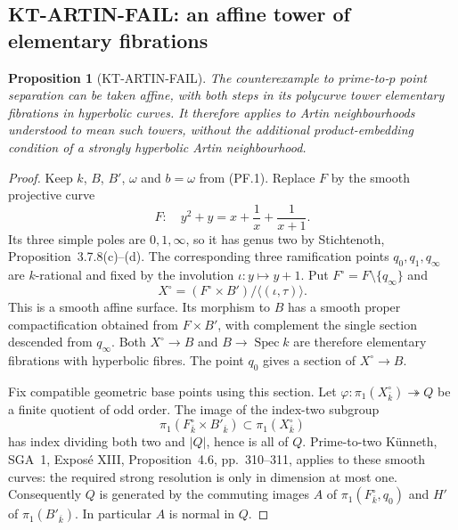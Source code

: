 \documentclass[11pt,a4paper]{article}
\newtheorem{proposition}[theorem]{Proposition}
\theoremstyle{definition}
\begin{document}
\subsection{KT-ARTIN-FAIL: an affine tower of elementary fibrations}
\label{sec:kt-artin-fail}

\begin{proposition}[KT-ARTIN-FAIL]
The counterexample to prime-to-$p$ point separation can be taken
affine, with both steps in its polycurve tower elementary
fibrations in hyperbolic curves. It therefore applies to Artin
neighbourhoods understood to mean such towers, without the
additional product-embedding condition of a \emph{strongly}
hyperbolic Artin neighbourhood.
\end{proposition}

\begin{proof}
Keep $k$, $B$, $B'$, $\omega$ and $b=\omega$ from (PF.1).
Replace $F$ by the smooth projective curve
\[
 F:\quad y^2+y=x+\frac1x+\frac1{x+1}.
                                                               \tag{AF.1}
\]
Its three simple poles are $0,1,\infty$, so it has genus two
by Stichtenoth, Proposition~3.7.8(c)--(d). The corresponding
three ramification points $q_0,q_1,q_\infty$ are $k$-rational
and fixed by the involution $\iota:y\mapsto y+1$.
Put $F^\circ=F\setminus\{q_\infty\}$ and
\[
 X^\circ=(F^\circ\times B')/\langle(\iota,\tau)\rangle.
                                                               \tag{AF.2}
\]
This is a smooth affine surface. Its morphism to $B$ has a
smooth proper compactification obtained from $F\times B'$,
with complement the single section descended from $q_\infty$.
Both $X^\circ\to B$ and $B\to\operatorname{Spec}k$ are
therefore elementary fibrations with hyperbolic fibres.
The point $q_0$ gives a section of $X^\circ\to B$.

Fix compatible geometric base points using this section.
Let $\varphi:\pi_1(X^\circ_{\overline k})\twoheadrightarrow Q$
be a finite quotient of odd order. The image of the index-two
subgroup
\[
 \pi_1(F^\circ_{\overline k}\times B'_{\overline k})
 \subset\pi_1(X^\circ_{\overline k})
\]
has index dividing both two and $|Q|$, hence is all of $Q$.
Prime-to-two K\"unneth, SGA~1, Expos\'e XIII,
Proposition~4.6, pp.~310--311, applies to these smooth curves:
the required strong resolution is only in dimension at most
one. Consequently $Q$ is generated by the commuting images
$A$ of $\pi_1(F^\circ_{\overline k},q_0)$ and $H'$ of
$\pi_1(B'_{\overline k})$. In particular $A$ is normal in $Q$.


\end{proof}
\end{document}

